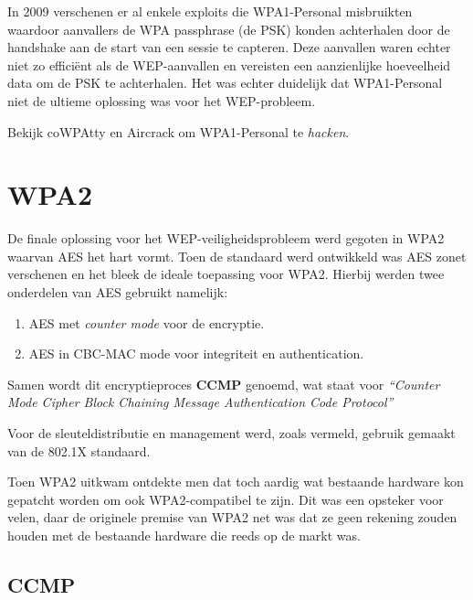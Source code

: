 \documentclass[
  10pt,
  dutch,
  paper=a4,
  ,captions=tableheading
]{scrbook}
\providecommand{\tightlist}{%
  \setlength{\itemsep}{0pt}\setlength{\parskip}{0pt}}
\begin{document}
In 2009 verschenen er al enkele exploits die WPA1-Personal misbruikten
waardoor aanvallers de WPA passphrase (de PSK) konden achterhalen door
de handshake aan de start van een sessie te capteren. Deze aanvallen
waren echter niet zo efficiënt als de WEP-aanvallen en vereisten een
aanzienlijke hoeveelheid data om de PSK te achterhalen. Het was echter
duidelijk dat WPA1-Personal niet de ultieme oplossing was voor het
WEP-probleem.

\begin{tipblock}
Bekijk coWPAtty en Aircrack om WPA1-Personal te \emph{hacken}.
\end{tipblock}

\section{WPA2}\label{wpa2}

De finale oplossing voor het WEP-veiligheidsprobleem werd gegoten in
WPA2 waarvan AES het hart vormt. Toen de standaard werd ontwikkeld was
AES zonet verschenen en het bleek de ideale toepassing voor WPA2.
Hierbij werden twee onderdelen van AES gebruikt namelijk:

\begin{enumerate}
\def\labelenumi{\arabic{enumi}.}
\tightlist
\item
  AES met \emph{counter mode} voor de encryptie.
\item
  AES in CBC-MAC mode voor integriteit en authentication.
\end{enumerate}

Samen wordt dit encryptieproces \textbf{CCMP} genoemd, wat staat voor
\emph{``Counter Mode Cipher Block Chaining Message Authentication Code
Protocol''}

Voor de sleuteldistributie en management werd, zoals vermeld, gebruik
gemaakt van de 802.1X standaard.

\begin{tipblock}
Toen WPA2 uitkwam ontdekte men dat toch aardig wat bestaande hardware
kon gepatcht worden om ook WPA2-compatibel te zijn. Dit was een opsteker
voor velen, daar de originele premise van WPA2 net was dat ze geen
rekening zouden houden met de bestaande hardware die reeds op de markt
was.
\end{tipblock}

\subsection{CCMP}\label{ccmp}
\end{document}
